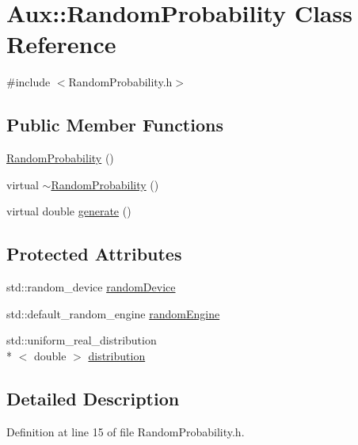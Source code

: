 \hypertarget{class_aux_1_1_random_probability}{\section{Aux\-:\-:Random\-Probability Class Reference}
\label{class_aux_1_1_random_probability}
}


{\ttfamily \#include $<$Random\-Probability.\-h$>$}

\subsection*{Public Member Functions}
\begin{DoxyCompactItemize}
\item 
\hyperlink{class_aux_1_1_random_probability_a6245bc307c811624b4d2c19b7a501ba6}{Random\-Probability} ()
\item 
virtual \hyperlink{class_aux_1_1_random_probability_a26406304e21f5208fd9528f883edbf93}{$\sim$\-Random\-Probability} ()
\item 
virtual double \hyperlink{class_aux_1_1_random_probability_aa3f2835c364aabb340440c45f6a28e33}{generate} ()
\end{DoxyCompactItemize}
\subsection*{Protected Attributes}
\begin{DoxyCompactItemize}
\item 
std\-::random\-\_\-device \hyperlink{class_aux_1_1_random_probability_ae714dbdb46cb0ab965d2e2f544f9ad4a}{random\-Device}
\item 
std\-::default\-\_\-random\-\_\-engine \hyperlink{class_aux_1_1_random_probability_af8f4edb5271507e52daad5b0ceff1680}{random\-Engine}
\item 
std\-::uniform\-\_\-real\-\_\-distribution\\*
$<$ double $>$ \hyperlink{class_aux_1_1_random_probability_aea37d3428c64a4d88cfec092f1fa5d85}{distribution}
\end{DoxyCompactItemize}


\subsection{Detailed Description}


Definition at line 15 of file Random\-Probability.\-h.



